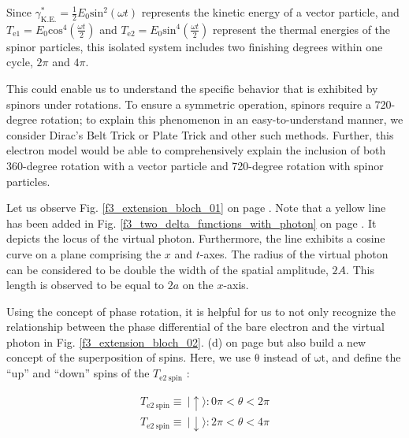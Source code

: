 \documentclass[%
 reprint,
 amsmath,amssymb,
 aps,
]{revtex4-1}
\numberwithin{equation}{section}
\begin{document}
    Since $\gamma^{*}_{\mathrm{K.E.}} = \frac{1}{2} E_{0} \mathrm{sin}^{2} (\omega t)$ represents the kinetic energy of a vector particle, and $T_{\mathrm{e1}} = E_{0} \mathrm{cos}^{4} \left ( \frac{\omega t}{2} \right)$ and $T_{\mathrm{e2}} = E_{0} \mathrm{sin}^{4} \left ( \frac{\omega t}{2} \right)$ represent the thermal energies of the spinor particles, this isolated system includes two finishing degrees within one cycle, $2\pi$ and $4\pi$.

    This could enable us to understand the specific behavior that is exhibited by spinors under rotations. To ensure a symmetric operation, spinors require a 720-degree rotation; to explain this phenomenon in an easy-to-understand manner, we consider Dirac's Belt Trick or Plate Trick and other such methods. Further, this electron model would be able to comprehensively explain the inclusion of both 360-degree rotation with a vector particle and 720-degree rotation with spinor particles.

    Let us observe Fig. \ref{f3_extension_bloch_01} on page \pageref{f3_extension_bloch_01}. Note that a yellow line has been added in Fig. \ref{f3_two_delta_functions_with_photon}  on page \pageref{f3_two_delta_functions_with_photon}. It depicts the locus of the virtual photon. Furthermore, the line exhibits a cosine curve on a plane comprising the $x$ and $t$-axes. The radius of the virtual photon can be considered to be double the width of the spatial amplitude, $2A$. This length is observed to be equal to $2a$ on the $x$-axis.

    Using the concept of phase rotation, it is helpful for us to not only recognize the relationship between the phase differential of the bare electron and the virtual photon in Fig. \ref{f3_extension_bloch_02}. (d) on page \pageref{f3_extension_bloch_02} but also build a new concept of the superposition of spins. Here, we use $\mathrm{\theta}$ instead of $\mathrm{\omega t}$, and define the ``up'' and ``down'' spins of the $T_{\mathrm{e2 \ spin}}$ :

        \begin{equation}
            \begin{split}
                T_{\mathrm{e2 \ spin}} \equiv \ \mid \uparrow \rangle : 0 \pi < \theta < 2\pi \\
                T_{\mathrm{e2 \ spin}} \equiv \ \mid \downarrow \rangle : 2 \pi < \theta < 4\pi
            \end{split}
            \label{e3_spin_Te2}
        \end{equation}
\end{document}
